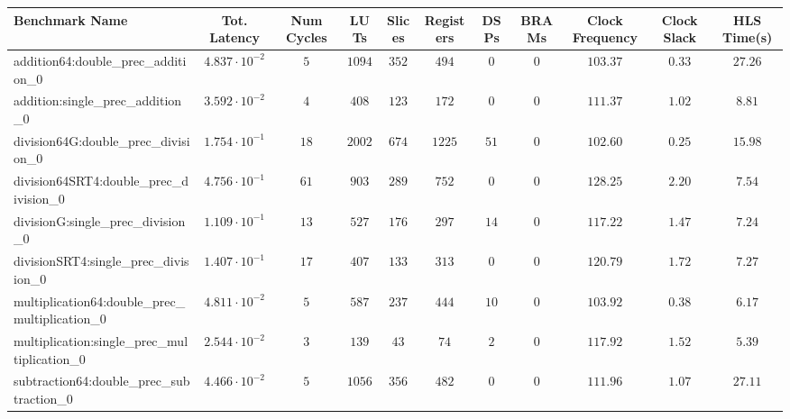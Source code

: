 \begin{tabular}{|l|c|c|c|c|c|c|c|c|c|c|}
\hline
Benchmark Name                                   & Tot. Latency            & Num Cycles & LUTs     & Slices   & Registers & DSPs   & BRAMs & Clock Frequency & Clock Slack & HLS Time(s) \\
\hline
addition64:double\_prec\_addition\_0             & $ 4.837 \cdot 10^{-2} $ & $ 5      $ & $ 1094 $ & $ 352  $ & $ 494   $ & $ 0  $ & $ 0 $ & $ 103.37      $ & $ 0.33    $ & $ 27.26   $ \\
addition:single\_prec\_addition\_0               & $ 3.592 \cdot 10^{-2} $ & $ 4      $ & $ 408  $ & $ 123  $ & $ 172   $ & $ 0  $ & $ 0 $ & $ 111.37      $ & $ 1.02    $ & $ 8.81    $ \\
division64G:double\_prec\_division\_0            & $ 1.754 \cdot 10^{-1} $ & $ 18     $ & $ 2002 $ & $ 674  $ & $ 1225  $ & $ 51 $ & $ 0 $ & $ 102.60      $ & $ 0.25    $ & $ 15.98   $ \\
division64SRT4:double\_prec\_division\_0         & $ 4.756 \cdot 10^{-1} $ & $ 61     $ & $ 903  $ & $ 289  $ & $ 752   $ & $ 0  $ & $ 0 $ & $ 128.25      $ & $ 2.20    $ & $ 7.54    $ \\
divisionG:single\_prec\_division\_0              & $ 1.109 \cdot 10^{-1} $ & $ 13     $ & $ 527  $ & $ 176  $ & $ 297   $ & $ 14 $ & $ 0 $ & $ 117.22      $ & $ 1.47    $ & $ 7.24    $ \\
divisionSRT4:single\_prec\_division\_0           & $ 1.407 \cdot 10^{-1} $ & $ 17     $ & $ 407  $ & $ 133  $ & $ 313   $ & $ 0  $ & $ 0 $ & $ 120.79      $ & $ 1.72    $ & $ 7.27    $ \\
multiplication64:double\_prec\_multiplication\_0 & $ 4.811 \cdot 10^{-2} $ & $ 5      $ & $ 587  $ & $ 237  $ & $ 444   $ & $ 10 $ & $ 0 $ & $ 103.92      $ & $ 0.38    $ & $ 6.17    $ \\
multiplication:single\_prec\_multiplication\_0   & $ 2.544 \cdot 10^{-2} $ & $ 3      $ & $ 139  $ & $ 43   $ & $ 74    $ & $ 2  $ & $ 0 $ & $ 117.92      $ & $ 1.52    $ & $ 5.39    $ \\
subtraction64:double\_prec\_subtraction\_0       & $ 4.466 \cdot 10^{-2} $ & $ 5      $ & $ 1056 $ & $ 356  $ & $ 482   $ & $ 0  $ & $ 0 $ & $ 111.96      $ & $ 1.07    $ & $ 27.11   $ \\

\end{tabular}
